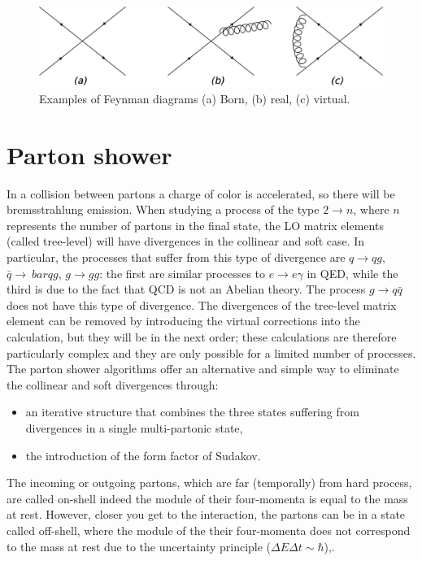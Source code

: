 \begin{figure}
\centering
\includegraphics[scale=0.22]{../Cap3/Fig_MC/nlo2}
\caption{ Examples of Feynman diagrams (a)  Born, (b) real, (c) virtual. }
\label{nlofig}
\end{figure}

 
\section{Parton shower}
In a collision between partons a charge of color is accelerated, so there will be bremsstrahlung emission. When studying a process of the type $ 2 \rightarrow n $, where $ n $ represents the number of partons in the final state, the LO matrix elements (called tree-level) will have divergences in the collinear  and 
soft case. In particular, the processes that suffer from this type of divergence are $ q \rightarrow qg $, $ \bar {q} \rightarrow \ bar{q} g $, $ g \rightarrow gg $: the first are similar processes to $ e \rightarrow e \gamma $ in QED, while the third is due to the fact that QCD is not an Abelian theory. The process $ g \rightarrow q \bar {q} $ does not have this type of divergence.
The divergences of the tree-level matrix element can be removed by introducing the virtual corrections into the calculation, but they will be in the next order; these calculations are therefore particularly complex and they are only possible for a limited number of processes. The parton shower \cite{Sjostrand: 2006su} algorithms offer an alternative and simple way to eliminate the collinear and soft divergences through:
\begin{itemize}
\item an iterative structure that combines the three states suffering from divergences in a single multi-partonic state,
\item the introduction of the form factor of Sudakov.
\end{itemize}
The incoming or outgoing partons, which are far (temporally) from hard process, are called on-shell indeed the module of their four-momenta   is equal to the mass at rest.
However, closer you get to the interaction,  the partons can be in a state called off-shell, where the module of the their four-momenta does not correspond to the mass at rest due to the uncertainty principle ($ \Delta E \Delta t \sim \hbar $),. 
